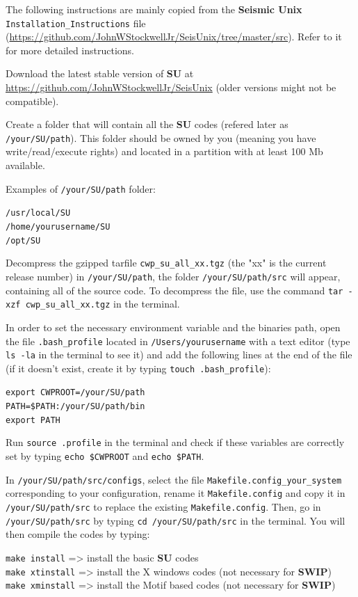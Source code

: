 \documentclass[twoside,a4paper]{article}
\def\SWIP{\textbf{SWIP}}
\def\SU{\textbf{SU}}
\def\SeismicUnix{\textbf{Seismic Unix}}
\begin{document}
The following instructions are mainly copied from the {\SeismicUnix} \verb|Installation_Instructions| file (\url{https://github.com/JohnWStockwellJr/SeisUnix/tree/master/src}). Refer to it for more detailed instructions.

Download the latest stable version of {\SU} at \url{https://github.com/JohnWStockwellJr/SeisUnix} (older versions might not be compatible).

Create a folder that will contain all the {\SU} codes (refered later as \verb|/your/SU/path|). This folder should be owned by you (meaning you have write/read/execute rights) and located in a partition with at least 100 Mb available.

Examples of \verb|/your/SU/path| folder:

\verb|/usr/local/SU|\\
\verb|/home/yourusername/SU|\\
\verb|/opt/SU|

Decompress the gzipped tarfile \verb|cwp_su_all_xx.tgz| (the "xx" is the current release number) in \verb|/your/SU/path|, the folder \verb|/your/SU/path/src| will appear, containing all of the source code. To decompress the file, use the command \verb|tar -xzf cwp_su_all_xx.tgz| in the terminal.

In order to set the necessary environment variable and the binaries path, open the file \verb|.bash_profile| located in \verb|/Users/yourusername| with a text editor (type \verb|ls -la| in the terminal to see it) and add the following lines at the end of the file (if it doesn't exist, create it by typing \verb|touch .bash_profile|):

\verb|export CWPROOT=/your/SU/path|\\
\verb|PATH=$PATH:/your/SU/path/bin|\\
\verb|export PATH|

Run \verb|source .profile| in the terminal and check if these variables are correctly set by typing \verb|echo $CWPROOT| and \verb|echo $PATH|.

In \verb|/your/SU/path/src/configs|, select the file \verb|Makefile.config_your_system| corresponding to your configuration, rename it \verb|Makefile.config| and copy it in \verb|/your/SU/path/src| to replace the existing \verb|Makefile.config|. Then, go in \verb|/your/SU/path/src| by typing \verb|cd /your/SU/path/src| in the terminal. You will then compile the codes by typing:

\verb|make install| => install the basic {\SU} codes\\
\verb|make xtinstall| => install the X windows codes (not necessary for {\SWIP})\\
\verb|make xminstall| => install the Motif based codes (not necessary for {\SWIP})
\end{document}
